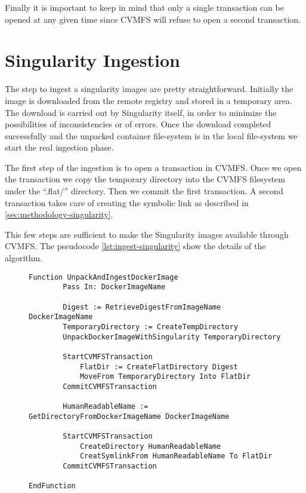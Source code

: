 Finally it is important to keep in mind that only a single transaction can be
opened at any given time since CVMFS will refuse to open a second transaction. 

\section{Singularity Ingestion}

The step to ingest a singularity images are pretty straightforward. Initially
the image is downloaded from the remote registry and stored in a temporary
area. The download is carried out by Singularity itself, in order to minimize
the possibilities of inconsistencies or of errors. Once the download completed
successfully and the unpacked container file-system is in the local file-system
we start the real ingestion phase.

The first step of the ingestion is to open a transaction in CVMFS. Once we open
the transaction we copy the temporary directory into the CVMFS filesystem under
the “.flat/” directory. Then we commit the first transaction. A second
transaction takes care of creating the symbolic link as described in
\ref{sec:methodology-singularity}.

This few steps are sufficient to make the Singularity images available through
CVMFS. The pseudocode \ref{lst:ingest-singularity} show the details of the
algorithm.

\begin{figure}
\begin{lstlisting}[caption={Algorithm to unpack a Docker image with Singularity and ingest it into CVMFS}, label={lst:ingest-singularity}]
Function UnpackAndIngestDockerImage
        Pass In: DockerImageName
        
        Digest := RetrieveDigestFromImageName DockerImageName
        TemporaryDirectory := CreateTempDirectory
        UnpackDockerImageWithSingularity TemporaryDirectory

        StartCVMFSTransaction
            FlatDir := CreateFlatDirectory Digest
            MoveFrom TemporaryDirectory Into FlatDir
        CommitCVMFSTransaction

        HumanReadableName := GetDirectoryFromDockerImageName DockerImageName
        
        StartCVMFSTransaction
            CreateDirectory HumanReadableName
            CreatSymlinkFrom HumanReadableName To FlatDir
        CommitCVMFSTransaction

EndFunction
\end{lstlisting}
\end{figure}

